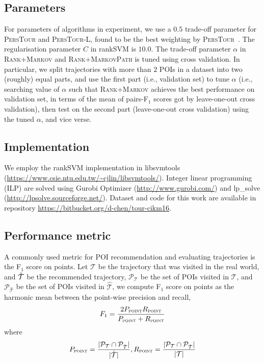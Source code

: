 \subsection{Parameters}
For parameters of algorithms in experiment,
we use a $0.5$ trade-off parameter for \textsc{PersTour} and \textsc{PersTour-L}, found to be the best weighting by \textsc{PersTour}~\cite{ijcai15}.
The regularisation parameter $C$ in rankSVM is $10.0$.
The trade-off parameter $\alpha$ in \textsc{Rank+Markov} and \textsc{Rank+MarkovPath} is tuned using cross validation.
In particular, we split trajectories with more than $2$ POIs in a dataset into two (roughly) equal parts,
and use the first part (i.e., validation set) to tune $\alpha$ (i.e., searching value of $\alpha$ such that \textsc{Rank+Markov} achieves the best performance on validation set, in terms of the mean of pairs-F$_1$ scores got by leave-one-out cross validation),
then test on the second part (leave-one-out cross validation) using the tuned $\alpha$, and vice verse.

\subsection{Implementation}
We employ the rankSVM implementation in libsvmtools (\url{https://www.csie.ntu.edu.tw/~cjlin/libsvmtools/}).
Integer linear programming (ILP) are solved using Gurobi Optimizer (\url{http://www.gurobi.com/})
and lp\_solve (\url{http://lpsolve.sourceforge.net/}).
Dataset and code for this work are available in repository \url{https://bitbucket.org/d-chen/tour-cikm16}.

\subsection{Performance metric}
A commonly used metric for POI recommendation and evaluating trajectories is
the F$_1$ score on points.
Let $\mathcal{T}$ be the trajectory that was visited in the real world,
and $\hat{\cal T}$ be the recommended trajectory,
$\mathcal{P}_{\mathcal{T}}$ be the set of POIs visited in $\mathcal{T}$,
and $\mathcal{P}_{\hat{\mathcal{T}}}$ be the set of POIs visited in $\hat{\mathcal{T}}$,
we compute F$_1$ score on points as the harmonic mean between the point-wise precision and recall,
\begin{displaymath}
F_1= \frac{2  P_{\textsc{point}}  R_{\textsc{point}}}
          {P_{\textsc{point}} + R_{\textsc{point}}}
\end{displaymath}
where
\vspace{-1.1em}
\begin{displaymath}%
P_{\textsc{point}} = \frac{|\mathcal{P}_{\mathcal{T}} \cap \mathcal{P}_{\hat{\mathcal{T}}}|}
                          {|\hat{\mathcal{T}}|},
R_{\textsc{point}} = \frac{|\mathcal{P}_{\mathcal{T}} \cap \mathcal{P}_{\hat{\mathcal{T}}}|}
                          {|\mathcal{T}|}
\end{displaymath}

